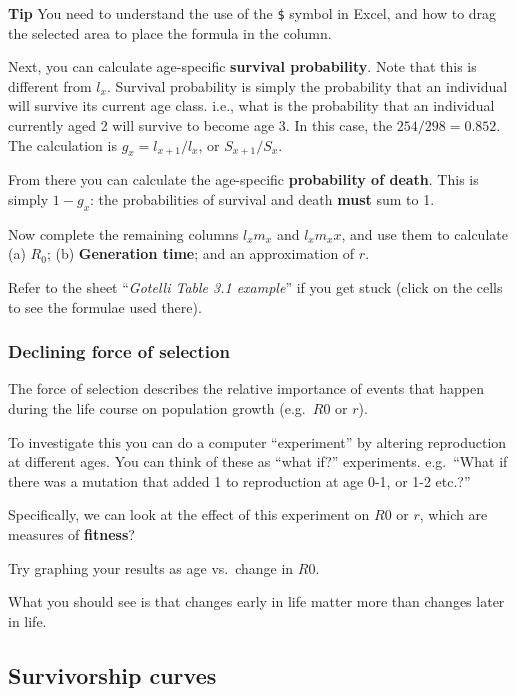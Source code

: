 \documentclass[
  a4paper]{book}
\begin{document}
\textbf{Tip} You need to understand the use of the \texttt{\$} symbol in Excel, and how to drag the selected area to place the formula in the column.

Next, you can calculate age-specific \textbf{survival probability}. Note that this is different from \(l_x\). Survival probability is simply the probability that an individual will survive its current age class. i.e., what is the probability that an individual currently aged 2 will survive to become age 3. In this case, the \(254/298 = 0.852\). The calculation is \(g_x = l_{x+1}/l_x\), or \(S_{x+1}/S_x\).

From there you can calculate the age-specific \textbf{probability of death}. This is simply \(1 - g_x\): the probabilities of survival and death \textbf{must} sum to 1.

Now complete the remaining columns \(l_x m_x\) and \(l_x m_x x\), and use them to calculate (a) \(R_0\); (b) \textbf{Generation time}; and an approximation of \(r\).

Refer to the sheet ``\emph{Gotelli Table 3.1 example}'' if you get stuck (click on the cells to see the formulae used there).

\subsubsection{Declining force of selection}\label{declining-force-of-selection}

The force of selection describes the relative importance of events that happen during the life course on population growth (e.g.~\(R0\) or \(r\)).

To investigate this you can do a computer ``experiment'' by altering reproduction at different ages. You can think of these as ``what if?'' experiments. e.g.~``What if there was a mutation that added 1 to reproduction at age 0-1, or 1-2 etc.?''

Specifically, we can look at the effect of this experiment on \(R0\) or \(r\), which are measures of \textbf{fitness}?

Try graphing your results as age vs.~change in \(R0\).

What you should see is that changes early in life matter more than changes later in life.

\subsection{Survivorship curves}\label{survivorship-curves}
\end{document}
